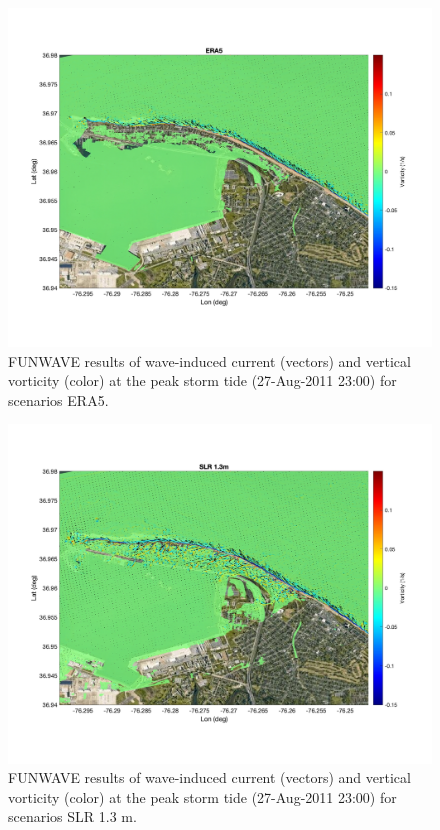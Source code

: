 \documentclass[preprint,12pt,authoryear] {elsarticle}
\begin{document}
\begin{figure}
\centering
\includegraphics[width=\textwidth]{./figures/funwave_ERA5_vort.jpg}
\caption{FUNWAVE results of wave-induced current (vectors) and vertical vorticity (color) at the peak storm tide (27-Aug-2011 23:00) for scenarios ERA5. }
\label{funwave_ERA5_vort}
\centering
\end{figure}

\begin{figure}
\centering
\includegraphics[width=\textwidth]{./figures/funwave_SLR_vort.jpg}
\caption{FUNWAVE results of wave-induced current (vectors) and vertical vorticity (color) at the peak storm tide (27-Aug-2011 23:00) for scenarios SLR 1.3 m.}
\label{funwave_SLR_vort}
\centering
\end{figure}
\end{document}

